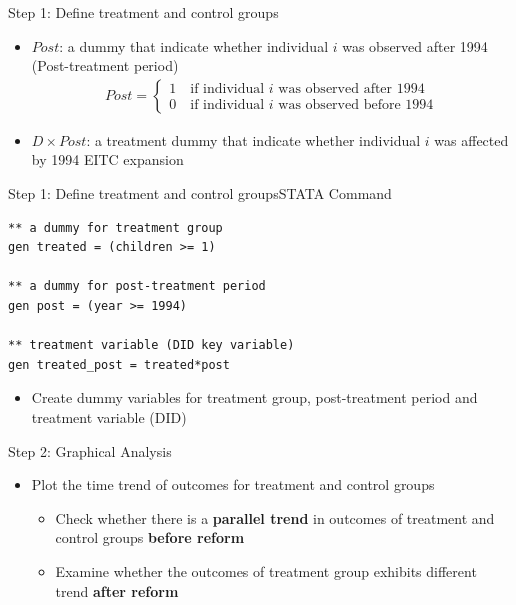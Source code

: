 \documentclass[dvipsnames,hyperref={pdfpagelabels=false}]{beamer}
\begin{document}
\begin{frame}{Step 1: Define treatment and control groups}
\begin{itemize}
\item $Post$: a dummy that indicate whether individual $i$ was observed after 1994 (Post-treatment period)
\begin{align*}
Post=\left\lbrace
\begin{array}{l}
1\quad \text{if individual $i$ was observed after 1994}\\
0\quad \text{if individual $i$ was observed before 1994}
\end{array} \right.
\end{align*}
\item $D \times Post$: a treatment dummy that indicate whether individual $i$ was affected by 1994 EITC expansion

\end{itemize}
\end{frame}



\begin{frame}[fragile]{Step 1: Define treatment and control groups}{STATA Command}


\begin{lstlisting}
** a dummy for treatment group
gen treated = (children >= 1)

** a dummy for post-treatment period
gen post = (year >= 1994)

** treatment variable (DID key variable)
gen treated_post = treated*post
\end{lstlisting}
\begin{itemize}
\item Create dummy variables for treatment group, post-treatment period and treatment variable (DID) 

\end{itemize}
\end{frame}





\begin{frame}{Step 2: Graphical Analysis}
\begin{itemize}
\item Plot the time trend of outcomes for treatment and control groups 
\vspace{0.2cm}
\begin{itemize}
\item Check whether there is a \textbf{parallel trend} in outcomes of treatment and control groups \textbf{before reform}
\vspace{0.2cm}
\item Examine whether the outcomes of treatment group exhibits different trend \textbf{after reform}
\end{itemize}
\end{itemize}
\end{frame}
\end{document}
